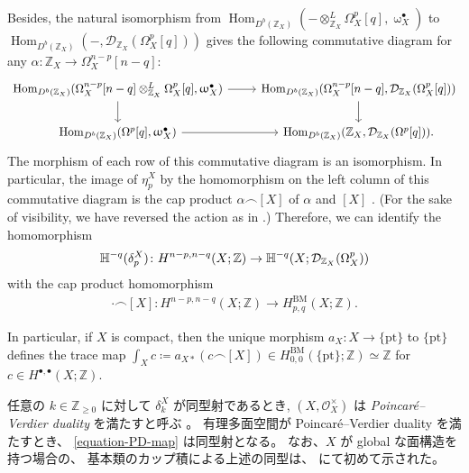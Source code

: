 \documentclass[a4paper,dvipdfmx,reqno,12pt]{amsart}
\theoremstyle{definition}
\newcommand{\deq}{\coloneqq}
\newcommand{\opn}[1]{\operatorname{#1}}
\numberwithin{equation}{section}
\begin{document}
Besides, the natural isomorphism from
$\opn{Hom}_{D^{b}(\mathbb{Z}_X)}(- 
\otimes^{L}_{\mathbb{Z}_X} \Omega_X^{p}[q],
\upomega_X^{\bullet})$ to 
$\opn{Hom}_{D^{b}(\mathbb{Z}_X)}(-,
\mathcal{D}_{\mathbb{Z}_X}(\Omega_X^{p}[q]))$
gives the following commutative diagram
for any $\alpha \colon \mathbb{Z}_X\to \Omega_X^{n-p}[n-q]$:
\[\begin{tikzcd}
{\opn{Hom}_{D^{b}(\mathbb{Z}_X)}(\Omega_X^{n-p}[n-q]
\otimes^{L}_{\mathbb{Z}_X} \Omega_X^{p}[q]
,\upomega_X^{\bullet})} & 
{\opn{Hom}_{D^{b}(\mathbb{Z}_X)}
(\Omega_X^{n-p}[n-q],\mathcal{D}_{\mathbb{Z}_X}(\Omega_X^{p}[q]))} \\
{\opn{Hom}_{D^{b}(\mathbb{Z}_X)}(\Omega^{p}[q],
\upomega_X^{\bullet})} & {\opn{Hom}_{D^{b}(\mathbb{Z}_X)}(\mathbb{Z}_X,\mathcal{D}_{\mathbb{Z}_X}(\Omega^{p}[q]))}.
	\arrow[from=1-2, to=2-2]
	\arrow[from=2-1, to=2-2]
	\arrow[from=1-1, to=1-2]
	\arrow[from=1-1, to=2-1]
\end{tikzcd}\]
The morphism of each row of
this commutative diagram is an isomorphism.
In particular,
the image of $\eta^X_{p}$ by the homomorphism
on the left column of this commutative diagram
is the cap product $\alpha\frown [X]$
of $\alpha$ and $[X]$ \cite[]{MR4637248}.
(For the sake of visibility, we have reversed 
the action as in \cite[]{MR4637248}.)
Therefore, we can identify
the homomorphism
\begin{align}
\mathbb{H}^{-q}(\delta_p^{X})
\colon H^{n-p,n-q}(X;\mathbb{Z})
\to \mathbb{H}^{-q}(X;\mathcal{D}_{\mathbb{Z}_X}
(\Omega_X^{p})) \notag
\end{align}
with the cap product homomorphism
\begin{align}
\label{equation-PD-map}
\cdot \frown [X]
\colon H^{n-p,n-q}(X;\mathbb{Z})
\to
H^{\mathrm{BM}}_{p,q}(X;\mathbb{Z}).
\end{align}

In particular, if $X$ is compact,
then the unique morphism 
$a_X\colon X\to \{\mathrm{pt}\}$
to $\{\mathrm{pt}\}$
defines the trace map
$\int_X c\deq a_{X*}(c\frown [X])\in 
H_{0,0}^{\mathrm{BM}}(\{\mathrm{pt}\};\mathbb{Z})
\simeq \mathbb{Z}$ for
$c\in H^{\bullet,\bullet}(X;\mathbb{Z})$.

任意の $k\in \mathbb{Z}_{\geq 0}$ に対して
$\delta_{k}^{X}$ が同型射であるとき,
$(X,\mathcal{O}_X^{\times})$ は
\emph{Poincar\'e--Verdier duality}
を満たすと呼ぶ \cite[Definition 6.4]{MR4637248}。
有理多面空間が Poincar\'e--Verdier duality を満たすとき、
\cref{equation-PD-map} は同型射となる。
なお、$X$ が global な面構造を持つ場合の、
基本類のカップ積による上述の同型は、
\cite[Theorem 5.3]{MR3894860} にて初めて示された。
\end{document}
